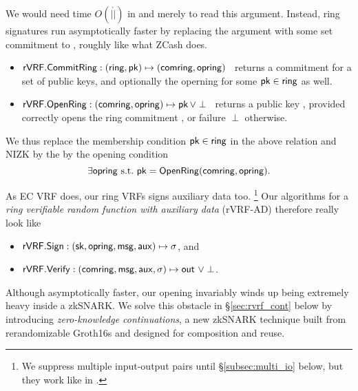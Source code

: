 We would need time $O(|\ring|)$ in \rSign and \rVerify merely to read
this \ring argument.  Instead, ring signatures run asymptotically faster
by replacing the \ring argument with some set commitment to \ring,
roughly like what ZCash does.
\begin{itemize}
\item ${\mathsf{rVRF}}.{\mathsf{CommitRing}} : (\mathsf{ring},\mathsf{pk}) \mapsto (\mathsf{comring},\mathsf{opring})$ \,
    returns a commitment for a set \ring of public keys, and
    optionally the operning \openring for some $\mathsf{pk} \in \mathsf{ring}$ as well.
\item ${\mathsf{rVRF}}.{\mathsf{OpenRing}} : (\mathsf{comring},\mathsf{opring}) \mapsto \mathsf{pk} \, \lor \perp$ \,
    returns a public key \pk, provided \openring correctly opens
    the ring commitment \comring, or failure $\perp$ otherwise.
\end{itemize}

We thus replace the membership condition $\mathsf{pk} \in \mathsf{ring}$ in the above
relation and NIZK by the by the opening condition
$$ \exists \mathsf{opring} \textrm{\ s.t.\ } \mathsf{pk} = {\mathsf{OpenRing}}(\mathsf{comring},\mathsf{opring}) . $$
%

As EC VRF does, our ring VRFs signs auxiliary data \aux too.%
\footnote{We suppress multiple input-output pairs until \S\ref{subsec:multi_io} below, but they work like in \cite{PrivacyPass}.}
Our algorithms for a {\em ring verifiable random function
with auxiliary data} (rVRF-AD) therefore really look like
\begin{itemize}
\item ${\mathsf{rVRF}}.{\mathsf{Sign}} : (\mathsf{sk},\mathsf{opring},\mathsf{msg},\mathsf{aux}) \mapsto \sigma$, \quad and
\item ${\mathsf{rVRF}}.{\mathsf{Verify}} : (\mathsf{comring},\mathsf{msg},\mathsf{aux},\sigma) \mapsto {\ensuremath{\mathsf{out}}} \,\, \lor \perp$.
\end{itemize}

Although asymptotically faster, our opening \OpenRing invariably
winds up being extremely heavy inside a zkSNARK.
We solve this obstacle in \S\ref{sec:rvrf_cont} below by introducing
{\em zero-knowledge continuations}, a new zkSNARK technique built from
rerandomizable Groth16s \cite{Groth16} and designed for composition and reuse.

